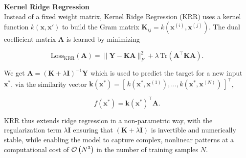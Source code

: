 \textbf{Kernel Ridge Regression}\\ %
Instead of a fixed weight matrix, Kernel Ridge Regression (KRR) uses a kernel function $k(\mathbf{x}, \mathbf{x}')$ to build the Gram matrix $\mathbf{K}_{ij} = k(\mathbf{x}^{(i)}, \mathbf{x}^{(j)})$. The dual coefficient matrix $\mathbf{A}$ is learned by minimizing

\begin{equation}
\label{eq:kernel_ridge_loss}
\mathrm{Loss}_{\mathrm{KRR}}(\mathbf{A})
= \|\mathbf{Y} - \mathbf{K}\mathbf{A}\|_F^2 + \lambda\,\mathrm{Tr}(\mathbf{A}^\top \mathbf{K}\mathbf{A}).
\end{equation}

We get $\mathbf{A} = (\mathbf{K} + \lambda \mathbf{I})^{-1} \mathbf{Y}$ which is used to predict the target for a new input $\mathbf{x}^*$, via the similarity vector $\mathbf{k}(\mathbf{x}^*) = [\,k(\mathbf{x}^*,\mathbf{x}^{(1)}),\dots,k(\mathbf{x}^*,\mathbf{x}^{(N)})\,]^\top$,

\begin{equation}
\label{eq:kernel_ridge_predict}
f(\mathbf{x}^*) = \mathbf{k}(\mathbf{x}^*)^\top \mathbf{A}.
\end{equation}

KRR thus extends ridge regression in a non-parametric way, with the regularization term $\lambda \mathbf{I}$ ensuring that $(\mathbf{K} + \lambda \mathbf{I})$ is invertible and numerically stable, while enabling the model to capture complex, nonlinear patterns at a computational cost of $\mathcal{O}\left(N^3\right)$ in the number of training samples $N$.
